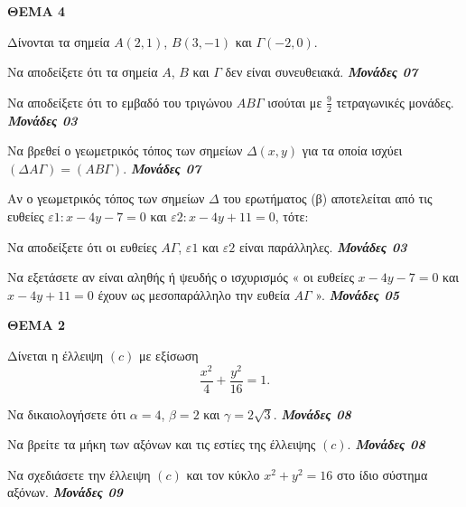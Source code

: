 \documentclass[11pt,a4paper,twoside]{book}
\newcommand{\OnPar}[1]{{\notoserif\bfseries\fontsize{18}{22}\selectfont #1}}
\newcommand{\monades}[1]{
\hspace*{\fill}
\textbf{\textit{\textcolor{maincolor}{Μονάδες #1}}}}
\begin{document}
\vspace{4mm}

\textbf{ΘΕΜΑ 4}

Δίνονται τα σημεία $A(2,1)$, $B(3,-1)$ και $\Gamma(-2,0)$.

\begin{alist}    \item
    \begin{rlist}
        \item Να αποδείξετε ότι τα σημεία $A$, $B$ και $\Gamma$ δεν είναι συνευθειακά. \monades{07}
        \item Να αποδείξετε ότι το εμβαδό του τριγώνου $AB\Gamma$ ισούται με $\frac{9}{2}$ τετραγωνικές μονάδες. \monades{03}
    \end{rlist}
    \item Να βρεθεί ο γεωμετρικός τόπος των σημείων $\Delta(x,y)$ για τα οποία ισχύει $(\Delta A\Gamma) = (AB\Gamma)$. \monades{07}
    \item Αν ο γεωμετρικός τόπος των σημείων $\Delta$ του ερωτήματος (β) αποτελείται από τις ευθείες $\varepsilon1:x-4y-7=0$ και $\varepsilon2 : x-4y+11=0$, τότε:
    \begin{rlist}
        \item Να αποδείξετε ότι οι ευθείες $A\Gamma$, $\varepsilon1$ και $\varepsilon2$ είναι παράλληλες. \monades{03}
        \item Να εξετάσετε αν είναι αληθής ή ψευδής ο ισχυρισμός « οι ευθείες $x-4y-7=0$ και $x-4y+11=0$ έχουν ως μεσοπαράλληλο την ευθεία $A\Gamma$ ». \monades{05}
    \end{rlist}\end{alist}

\vspace{4mm}

{\OnPar{ΘΕΜΑ 2}}

Δίνεται η έλλειψη \((c)\) με εξίσωση
\[ \frac{x^2}{4} + \frac{y^2}{16} = 1. \]

\begin{alist}    \item Να δικαιολογήσετε ότι $\alpha = 4$, $\beta = 2$ και $\gamma = 2\sqrt{3}$. \monades{08}
    \item Να βρείτε τα μήκη των αξόνων και τις εστίες της έλλειψης \((c)\). \monades{08}
    \item Να σχεδιάσετε την έλλειψη \((c)\) και τον κύκλο $x^2 + y^2 = 16$ στο ίδιο σύστημα αξόνων. \monades{09}\end{alist}
\end{document}
